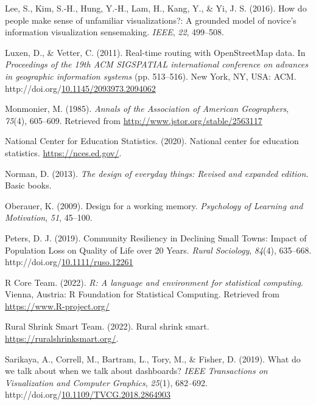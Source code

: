 \documentclass[print]{nuthesis}
\newlength{\cslhangindent}
\newenvironment{CSLReferences}[2]%
{\setlength{\parindent}{0pt}%
\everypar{\setlength{\hangindent}{\cslhangindent}}\ignorespaces}%
{\par}
\begin{document}
\begin{CSLReferences}{1}{0}
\leavevmode{}%
Lee, S., Kim, S.-H., Hung, Y.-H., Lam, H., Kang, Y., \& Yi, J. S. (2016). How do people make sense of unfamiliar visualizations?: A grounded model of novice's information visualization sensemaking. \emph{IEEE}, \emph{22}, 499--508.

\leavevmode{}%
Luxen, D., \& Vetter, C. (2011). Real-time routing with OpenStreetMap data. In \emph{Proceedings of the 19th ACM SIGSPATIAL international conference on advances in geographic information systems} (pp. 513--516). New York, NY, USA: ACM. http://doi.org/\href{https://doi.org/10.1145/2093973.2094062}{10.1145/2093973.2094062}

\leavevmode{}%
Monmonier, M. (1985). \emph{Annals of the Association of American Geographers}, \emph{75}(4), 605--609. Retrieved from \url{http://www.jstor.org/stable/2563117}

\leavevmode{}%
National Center for Education Statistics. (2020). National center for education statistics. \url{https://nces.ed.gov/}.

\leavevmode{}%
Norman, D. (2013). \emph{The design of everyday things: Revised and expanded edition}. Basic books.

\leavevmode{}%
Oberauer, K. (2009). Design for a working memory. \emph{Psychology of Learning and Motivation}, \emph{51}, 45--100.

\leavevmode{}%
Peters, D. J. (2019). Community {Resiliency} in {Declining} {Small} {Towns}: {Impact} of {Population} {Loss} on {Quality} of {Life} over 20 {Years}. \emph{Rural Sociology}, \emph{84}(4), 635--668. http://doi.org/\href{https://doi.org/10.1111/ruso.12261}{10.1111/ruso.12261}

\leavevmode{}%
R Core Team. (2022). \emph{R: A language and environment for statistical computing}. Vienna, Austria: R Foundation for Statistical Computing. Retrieved from \url{https://www.R-project.org/}

\leavevmode{}%
Rural Shrink Smart Team. (2022). Rural shrink smart. \url{https://ruralshrinksmart.org/}.

\leavevmode{}%
Sarikaya, A., Correll, M., Bartram, L., Tory, M., \& Fisher, D. (2019). What do we talk about when we talk about dashboards? \emph{IEEE Transactions on Visualization and Computer Graphics}, \emph{25}(1), 682--692. http://doi.org/\href{https://doi.org/10.1109/TVCG.2018.2864903}{10.1109/TVCG.2018.2864903}


\end{CSLReferences}
\end{document}
